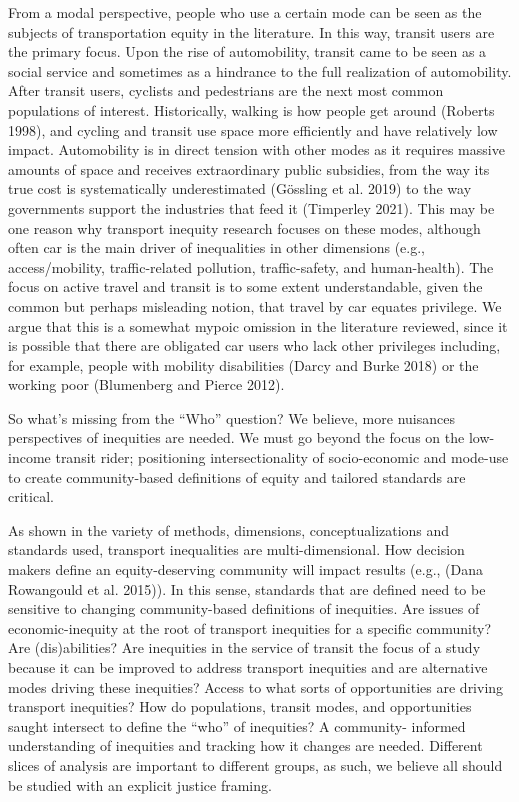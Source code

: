 \documentclass[12pt, oneside]{report}
\begin{document}
From a modal perspective, people who use a certain mode can be seen as
the subjects of transportation equity in the literature. In this way,
transit users are the primary focus. Upon the rise of automobility,
transit came to be seen as a social service and sometimes as a hindrance
to the full realization of automobility. After transit users, cyclists
and pedestrians are the next most common populations of interest.
Historically, walking is how people get around (Roberts 1998), and
cycling and transit use space more efficiently and have relatively low
impact. Automobility is in direct tension with other modes as it
requires massive amounts of space and receives extraordinary public
subsidies, from the way its true cost is systematically underestimated
(Gössling et al. 2019) to the way governments support the industries
that feed it (Timperley 2021). This may be one reason why transport
inequity research focuses on these modes, although often car is the main
driver of inequalities in other dimensions (e.g., access/mobility,
traffic-related pollution, traffic-safety, and human-health). The focus
on active travel and transit is to some extent understandable, given the
common but perhaps misleading notion, that travel by car equates
privilege. We argue that this is a somewhat mypoic omission in the
literature reviewed, since it is possible that there are obligated car
users who lack other privileges including, for example, people with
mobility disabilities (Darcy and Burke 2018) or the working poor
(Blumenberg and Pierce 2012).

So what's missing from the ``Who'' question? We believe, more nuisances
perspectives of inequities are needed. We must go beyond the focus on
the low-income transit rider; positioning intersectionality of
socio-economic and mode-use to create community-based definitions of
equity and tailored standards are critical.

As shown in the variety of methods, dimensions, conceptualizations and
standards used, transport inequalities are multi-dimensional. How
decision makers define an equity-deserving community will impact results
(e.g., (Dana Rowangould et al. 2015)). In this sense, standards that are
defined need to be sensitive to changing community-based definitions of
inequities. Are issues of economic-inequity at the root of transport
inequities for a specific community? Are (dis)abilities? Are inequities
in the service of transit the focus of a study because it can be
improved to address transport inequities and are alternative modes
driving these inequities? Access to what sorts of opportunities are
driving transport inequities? How do populations, transit modes, and
opportunities saught intersect to define the ``who'' of inequities? A
community- informed understanding of inequities and tracking how it
changes are needed. Different slices of analysis are important to
different groups, as such, we believe all should be studied with an
explicit justice framing.
\end{document}
